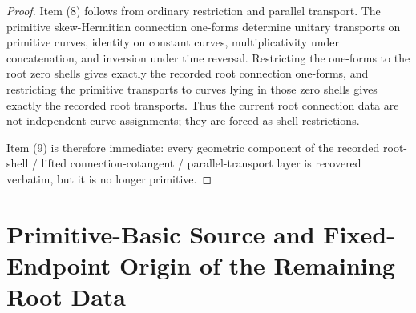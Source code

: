 \documentclass[11pt]{article}
\begin{document}
\begin{proof}
Item (8) follows from ordinary restriction and parallel transport. The primitive skew-Hermitian connection one-forms determine unitary transports on primitive curves, identity on constant curves, multiplicativity under concatenation, and inversion under time reversal. Restricting the one-forms to the root zero shells gives exactly the recorded root connection one-forms, and restricting the primitive transports to curves lying in those zero shells gives exactly the recorded root transports. Thus the current root connection data are not independent curve assignments; they are forced as shell restrictions.

Item (9) is therefore immediate: every geometric component of the recorded root-shell / lifted connection-cotangent / parallel-transport layer is recovered verbatim, but it is no longer primitive.
\end{proof}

\section{Primitive-Basic Source and Fixed-Endpoint Origin of the Remaining Root Data}
\end{document}
